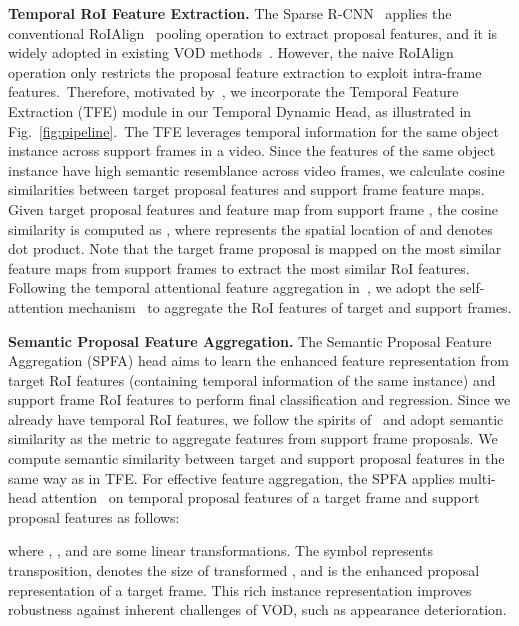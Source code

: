 \documentclass{bmvc2k}
\begin{document}
\noindent \textbf{Temporal RoI Feature Extraction.}
\label{subsec:troi}
The Sparse R-CNN~\cite{sun2021sparse} applies the conventional RoIAlign~\cite{he2017mask} pooling operation to extract proposal features, and it is widely adopted in existing VOD methods~\cite{wu2019sequence, zhu2017flow, han2020mining}. However, the naive RoIAlign operation only restricts the proposal feature extraction to exploit intra-frame features.~Therefore, motivated by~\cite{gong2021temporal}, we incorporate the Temporal Feature Extraction (TFE) module in our Temporal Dynamic Head, as illustrated in Fig.~\ref{fig:pipeline}.~The TFE leverages temporal information for the same object instance across support frames in a video. Since the features of the same object instance have high semantic resemblance across video frames, we calculate cosine similarities between target proposal features and support frame feature maps. Given target proposal features  and feature map from support frame , the cosine similarity  is computed as , where  represents the spatial location of  and  denotes dot product. Note that the target frame proposal is mapped on the most similar feature maps from support frames to extract the most similar RoI features. Following the temporal attentional feature aggregation in~\cite{gong2021temporal}, we adopt the self-attention mechanism~\cite{vaswani2017attention} to aggregate the RoI features of target and support frames.

\vspace{3pt}
\noindent \textbf{Semantic Proposal Feature Aggregation.}
\label{subsec:tfa}
The Semantic Proposal Feature Aggregation (SPFA) head aims to learn the enhanced feature representation from target RoI features (containing temporal information of the same instance) and support frame RoI features to perform final classification and regression. Since we already have temporal RoI features, we follow the spirits of~\cite{wu2019sequence} and adopt semantic similarity as the metric to aggregate features from support frame proposals. We compute semantic similarity between target and support proposal features in the same way as in TFE.
For effective feature aggregation, the SPFA applies multi-head attention~\cite{vaswani2017attention} on temporal proposal features of a target frame  and support proposal features  as  follows: 
\vspace{-6pt}

\noindent where , , and  are some linear transformations. The symbol  represents transposition,  denotes the size of transformed , and  is the enhanced proposal representation of a target frame. This rich instance representation improves robustness against inherent challenges of VOD, such as appearance deterioration.
\end{document}
